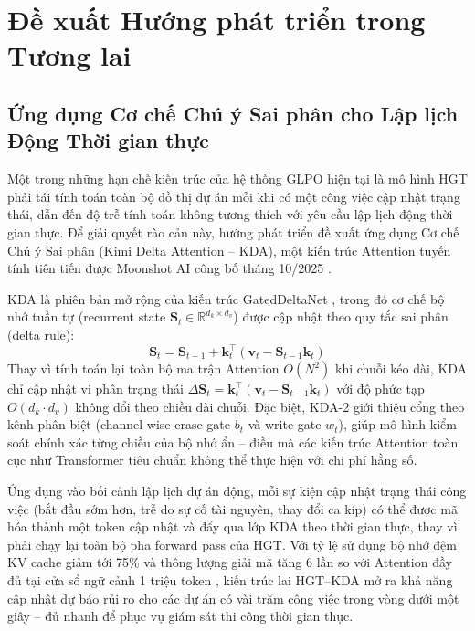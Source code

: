 \section{Đề xuất Hướng phát triển trong Tương lai}
\label{sec:4.3_huong_phat_trien}

\subsection{Ứng dụng Cơ chế Chú ý Sai phân cho Lập lịch Động Thời gian thực}
\label{sec:4.3.1_delta_attention}

Một trong những hạn chế kiến trúc của hệ thống GLPO hiện tại là mô hình HGT phải tái tính toán toàn bộ đồ thị dự án mỗi khi có một công việc cập nhật trạng thái, dẫn đến độ trễ tính toán không tương thích với yêu cầu lập lịch động thời gian thực. Để giải quyết rào cản này, hướng phát triển đề xuất ứng dụng Cơ chế Chú ý Sai phân (Kimi Delta Attention -- KDA), một kiến trúc Attention tuyến tính tiên tiến được Moonshot AI công bố tháng 10/2025 \cite{moonshot2025kimilinear}.

KDA là phiên bản mở rộng của kiến trúc GatedDeltaNet \cite{yang2024gated}, trong đó cơ chế bộ nhớ tuần tự (recurrent state $\mathbf{S}_t \in \mathbb{R}^{d_k \times d_v}$) được cập nhật theo quy tắc sai phân (delta rule):
\begin{equation}
    \mathbf{S}_t = \mathbf{S}_{t-1} + \mathbf{k}_t^\top \left(\mathbf{v}_t - \mathbf{S}_{t-1}\mathbf{k}_t\right)
\end{equation}
Thay vì tính toán lại toàn bộ ma trận Attention $O(N^2)$ khi chuỗi kéo dài, KDA chỉ cập nhật vi phân trạng thái $\Delta\mathbf{S}_t = \mathbf{k}_t^\top(\mathbf{v}_t - \mathbf{S}_{t-1}\mathbf{k}_t)$ với độ phức tạp $O(d_k \cdot d_v)$ không đổi theo chiều dài chuỗi. Đặc biệt, KDA-2 giới thiệu cổng theo kênh phân biệt (channel-wise erase gate $b_t$ và write gate $w_t$), giúp mô hình kiểm soát chính xác từng chiều của bộ nhớ ẩn -- điều mà các kiến trúc Attention toàn cục như Transformer tiêu chuẩn không thể thực hiện với chi phí hằng số.

Ứng dụng vào bối cảnh lập lịch dự án động, mỗi sự kiện cập nhật trạng thái công việc (bắt đầu sớm hơn, trễ do sự cố tài nguyên, thay đổi ca kíp) có thể được mã hóa thành một token cập nhật và đẩy qua lớp KDA theo thời gian thực, thay vì phải chạy lại toàn bộ pha forward pass của HGT. Với tỷ lệ sử dụng bộ nhớ đệm KV cache giảm tới 75\% và thông lượng giải mã tăng 6 lần so với Attention đầy đủ tại cửa sổ ngữ cảnh 1 triệu token \cite{moonshot2025kimilinear}, kiến trúc lai HGT--KDA mở ra khả năng cập nhật dự báo rủi ro cho các dự án có vài trăm công việc trong vòng dưới một giây -- đủ nhanh để phục vụ giám sát thi công thời gian thực.

